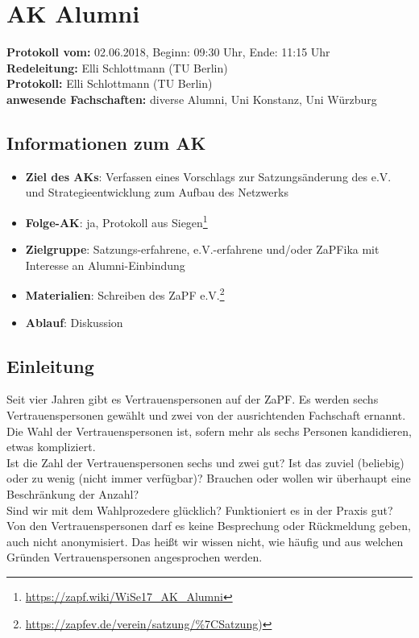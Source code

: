 
\section{AK Alumni}

  \textbf{Protokoll vom:} 02.06.2018,
  Beginn: 09:30 Uhr,
  Ende: 11:15 Uhr \\
  \textbf{Redeleitung:} Elli Schlottmann (TU Berlin) \\
  \textbf{Protokoll:} Elli Schlottmann (TU Berlin) \\
  \textbf{anwesende Fachschaften:} diverse Alumni, Uni Konstanz, Uni Würzburg

  \subsection*{Informationen zum AK}
    \begin{itemize}
      \item \textbf{Ziel des AKs}: Verfassen eines Vorschlags zur Satzungsänderung des e.V. und Strategieentwicklung zum Aufbau des Netzwerks
      \item \textbf{Folge-AK}: ja, Protokoll aus Siegen\footnote{\url{https://zapf.wiki/WiSe17_AK_Alumni}}
      \item \textbf{Zielgruppe}: Satzungs-erfahrene, e.V.-erfahrene und/oder ZaPFika mit Interesse an Alumni-Einbindung
      \item \textbf{Materialien}: Schreiben des ZaPF e.V.\footnote{\url{https://zapfev.de/verein/satzung/\%7CSatzung})}
      \item \textbf{Ablauf}: Diskussion
    \end{itemize}

  \subsection*{Einleitung}
Seit vier Jahren gibt es Vertrauenspersonen auf der ZaPF. Es werden sechs Vertrauenspersonen gewählt und zwei von der ausrichtenden Fachschaft ernannt. Die Wahl der Vertrauenspersonen ist, sofern mehr als sechs Personen kandidieren, etwas kompliziert. \\ 

    Ist die Zahl der Vertrauenspersonen sechs und zwei gut? Ist das zuviel (beliebig) oder zu wenig (nicht immer verfügbar)? Brauchen oder wollen wir überhaupt eine Beschränkung der Anzahl? \\
    Sind wir mit dem Wahlprozedere glücklich? Funktioniert es in der Praxis gut? \\
    Von den Vertrauenspersonen darf es keine Besprechung oder Rückmeldung geben, auch nicht anonymisiert. Das heißt wir wissen nicht, wie häufig und aus welchen Gründen Vertrauenspersonen angesprochen werden. \\ 

